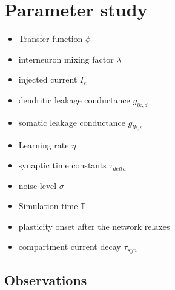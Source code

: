 \documentclass[11pt,a4paper,titlepage]{report}
\begin{document}
\section{Parameter study}
\begin{itemize}

  \item Transfer function $\phi$
  \item interneuron mixing factor $\lambda$
  \item injected current $I_e$
  \item dendritic leakage conductance $g_{lk,d}$
  \item somatic leakage conductance $g_{lk,s}$
  \item Learning rate $\eta$
  \item synaptic time constants $\tau_{delta}$
  \item noise level $\sigma$
  \item Simulation time $\mathbb{T}$
  \item plasticity onset after the network relaxes
  \item compartment current decay $\tau_{syn}$

\end{itemize}


\subsection*{Observations}
\end{document}
